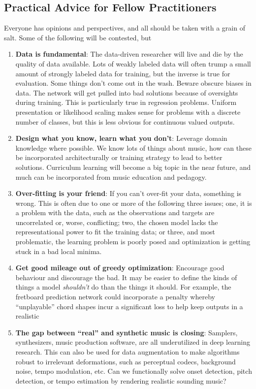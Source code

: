 \subsection{Practical Advice for Fellow Practitioners}

%
Everyone has opinions and perspectives, and all should be taken with a grain of salt.
Some of the following will be contested, but

\begin{enumerate}
\item \textbf{Data is fundamental}: The data-driven researcher will live and die by the quality of data available. Lots of weakly labeled data will often trump a small amount of strongly labeled data for training, but the inverse is true for evaluation. Some things don't come out in the wash.
Beware obscure biases in data. The network will get pulled into bad solutions because of oversights during training. This is particularly true in regression problems. Uniform presentation or likelihood scaling makes sense for problems with a discrete number of classes, but this is less obvious for continuous valued outputs.

\item \textbf{Design what you know, learn what you don't}: Leverage domain knowledge where possible.
We know lots of things about music, how can these be incorporated architecturally or training strategy to lead to better solutions.
Curriculum learning will become a big topic in the near future, and much can be incorporated from music education and pedagogy.

\item \textbf{Over-fitting is your friend}: If you can't over-fit your data, something is wrong.
This is often due to one or more of the following three issues;
one, it is a problem with the data, such as the observations and targets are uncorrelated or, worse, conflicting;
two, the chosen model lacks the representational power to fit the training data;
or three, and most problematic, the learning problem is poorly posed and optimization is getting stuck in a bad local minima.

\item \textbf{Get good mileage out of greedy optimization}: Encourage good behaviour and discourage the bad. It may be easier to define the kinds of things a model \emph{shouldn't} do than the things it should. For example, the fretboard prediction network could incorporate a penalty whereby ``unplayable'' chord shapes incur a significant loss to help keep outputs in a realistic

\item \textbf{The gap between ``real'' and synthetic music is closing}: Samplers, synthesizers, music production software, are all underutilized in deep learning research.
This can also be used for data augmentation to make algorithms robust to irrelevant deformations, such as perceptual codecs, background noise, tempo modulation, etc.
Can we functionally solve onset detection, pitch detection, or tempo estimation by rendering realistic sounding music?
\end{enumerate}

